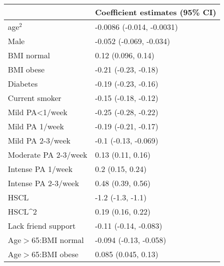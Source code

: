 \begin{tabular}{ll}
& Coefficient estimates (95\% CI) \\ 
\hline 
age$^2$ & -0.0086 (-0.014, -0.0031) \\ 
Male & -0.052 (-0.069, -0.034) \\ 
BMI normal & 0.12 (0.096, 0.14) \\ 
BMI obese & -0.21 (-0.23, -0.18) \\ 
Diabetes & -0.19 (-0.23, -0.16) \\ 
Current smoker & -0.15 (-0.18, -0.12) \\ 
Mild PA<1/week & -0.25 (-0.28, -0.22) \\ 
Mild PA 1/week & -0.19 (-0.21, -0.17) \\ 
Mild PA 2-3/week & -0.1 (-0.13, -0.069) \\ 
Moderate PA 2-3/week & 0.13 (0.11, 0.16) \\ 
Intense PA 1/week & 0.2 (0.15, 0.24) \\ 
Intense PA 2-3/week & 0.48 (0.39, 0.56) \\ 
HSCL & -1.2 (-1.3, -1.1) \\ 
HSCL^2 & 0.19 (0.16, 0.22) \\ 
Lack friend support & -0.11 (-0.14, -0.083) \\ 
Age$>$65:BMI normal & -0.094 (-0.13, -0.058) \\ 
Age$>$65:BMI obese & 0.085 (0.045, 0.13) \\ 
\hline 
\end{tabular}